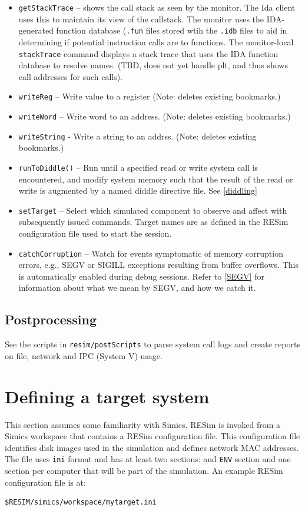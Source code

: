 \documentclass[titlepage]{article}
\begin{document}
\begin{itemize}
\item {\tt getStackTrace} – shows the call stack as seen by the monitor.  The Ida client uses this to maintain its view of the callstack.  The monitor
uses the IDA-generated function database ({\tt .fun} files stored wtih the {\tt .idb} files to aid in determining if 
potential instruction calls are to functions.  The monitor-local {\tt stackTrace} command displays a
stack trace that uses the IDA function database to resolve names.  (TBD, does not yet handle plt, and thus shows call addresses for such calls).
\item {\tt writeReg} – Write value to a register (Note: deletes existing bookmarks.)
\item {\tt writeWord} – Write word to an address. (Note: deletes existing bookmarks.)
\item {\tt writeString} - Write a string to an addrss. (Note: deletes existing bookmarks.)

\item {\tt runToDiddle()} – Run until a specified read or write system call is encountered, and modify system memory such
that the result of the read or write is augmented by a named diddle directive file.  See \ref{diddling}

\item {\tt setTarget} -- Select which simulated component to observe and affect with subsequently issued commands.  Target names are as defined in the
RESim configuration file used to start the session.

\item {\tt catchCorruption} – Watch for events symptomatic of memory corruption errors, e.g., SEGV or SIGILL exceptions resulting from buffer overflows.  This is automatically enabled during debug sessions. Refer to \ref{SEGV} for information about what we mean by SEGV, and how we catch it.
\end{itemize}

\subsection{Postprocessing}
\label{postprocessing}
See the scripts in {\tt resim/postScripts} to parse system call logs and create reports on file, network and IPC (System V) usage.

\section{Defining a target system}
\label{configuration}
This section assumes some familiarity with Simics.  RESim is invoked from a Simics workspace that contains a RESim configuration file.
This configuration file identifies disk images used in the simulation and defines network MAC addresses.  
The file uses {\tt ini} format and has at least two sections: and {\tt ENV} section and one section per computer that will be part
of the simulation.  An example RESim configuration file is at:
\begin{verbatim}
$RESIM/simics/workspace/mytarget.ini
\end{verbatim}
\end{document}
